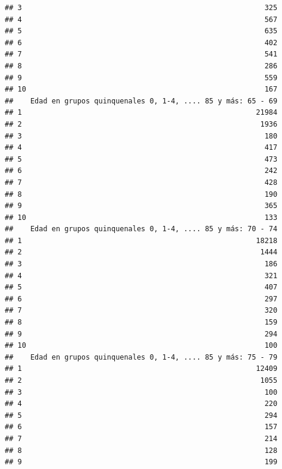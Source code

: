 \documentclass[11pt,]{article}
\begin{document}
\begin{verbatim}
## 3                                                         325
## 4                                                         567
## 5                                                         635
## 6                                                         402
## 7                                                         541
## 8                                                         286
## 9                                                         559
## 10                                                        167
##    Edad en grupos quinquenales 0, 1-4, .... 85 y más: 65 - 69
## 1                                                       21984
## 2                                                        1936
## 3                                                         180
## 4                                                         417
## 5                                                         473
## 6                                                         242
## 7                                                         428
## 8                                                         190
## 9                                                         365
## 10                                                        133
##    Edad en grupos quinquenales 0, 1-4, .... 85 y más: 70 - 74
## 1                                                       18218
## 2                                                        1444
## 3                                                         186
## 4                                                         321
## 5                                                         407
## 6                                                         297
## 7                                                         320
## 8                                                         159
## 9                                                         294
## 10                                                        100
##    Edad en grupos quinquenales 0, 1-4, .... 85 y más: 75 - 79
## 1                                                       12409
## 2                                                        1055
## 3                                                         100
## 4                                                         220
## 5                                                         294
## 6                                                         157
## 7                                                         214
## 8                                                         128
## 9                                                         199

\end{verbatim}
\end{document}
